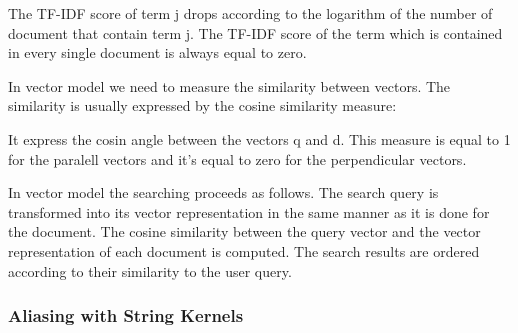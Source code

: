 The TF-IDF score of term j drops according to the logarithm of the number of document that contain term j. The TF-IDF score of the term which is contained in every single document is always equal to zero.


In vector model we need to measure the similarity between vectors. The similarity is usually expressed by the cosine similarity measure:


It express the cosin angle between the vectors q and d. This measure is equal to 1 for the paralell vectors and it's equal to zero for the perpendicular vectors.

In vector model the searching proceeds as follows. The search query is transformed into its vector representation in the same manner as it is done for the document. The cosine similarity between the query vector and the vector representation of each document is computed. The search results are ordered according to their similarity to the user query.  


\subsubsection {Aliasing with String Kernels}
\label{sec:aliasing_string_kernel}
